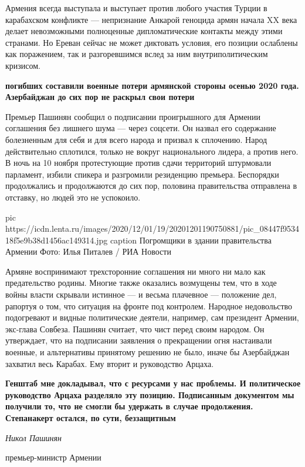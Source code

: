 Армения всегда выступала и выступает против любого участия Турции в карабахском
конфликте — непризнание Анкарой геноцида армян начала XX века делает
невозможными полноценные дипломатические контакты между этими странами. Но
Ереван сейчас не может диктовать условия, его позиции ослаблены как поражением,
так и разгоревшимся вслед за ним внутриполитическим кризисом.

\begin{leftbar}
	\bfseries
{\Huge\color{orange}}
погибших
составили военные потери армянской стороны осенью 2020 года. Азербайджан до сих пор не раскрыл свои потери
\end{leftbar}

Премьер Пашинян сообщил о подписании проигрышного для Армении соглашения без
лишнего шума — через соцсети. Он назвал его содержание болезненным для себя и
для всего народа и призвал к сплочению. Народ действительно сплотился, только
не вокруг национального лидера, а против него. В ночь на 10 ноября протестующие
против сдачи территорий штурмовали парламент, избили спикера и разгромили
резиденцию премьера. Беспорядки продолжались и продолжаются до сих пор,
половина правительства отправлена в отставку, но людей это не успокоило.

\ifcmt
pic https://icdn.lenta.ru/images/2020/12/01/19/20201201190750881/pic_08447f953418f5e9b38d1456ac149314.jpg
caption Погромщики в здании правительства Армении Фото: Илья Питалев / РИА Новости
\fi

Армяне воспринимают трехсторонние соглашения ни много ни мало как предательство
родины. Многие также оказались возмущены тем, что в ходе войны власти скрывали
истинное — и весьма плачевное — положение дел, рапортуя о том, что ситуация на
фронте под контролем. Народное недовольство подогревают и видные политические
деятели, например, сам президент Армении, экс-глава Совбеза. Пашинян считает,
что чист перед своим народом. Он утверждает, что на подписании заявления о
прекращении огня настаивали военные, и альтернативы принятому решению не было,
иначе бы Азербайджан захватил весь Карабах. Ему вторит и руководство Арцаха.


\begin{leftbar}
	\bfseries
Генштаб мне докладывал, что с ресурсами у нас проблемы. И политическое
руководство Арцаха разделяло эту позицию. Подписанным документом мы получили
то, что не смогли бы удержать в случае продолжения. Степанакерт остался, по
сути, беззащитным\par
\em
Никол Пашинян\par
премьер-министр Армении 
\end{leftbar}

